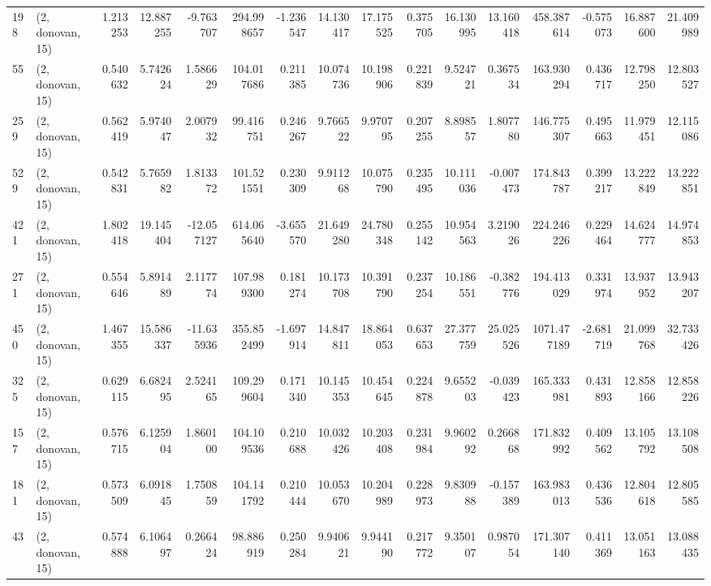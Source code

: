 \begin{tabular}{llrrrrrrrrrrrrrr}
198 &  (2, donovan, 15) &   1.213253 &  12.887255 &  -9.763707 &   294.998657 &  -1.236547 &  14.130417 &  17.175525 &  0.375705 &  16.130995 &  13.160418 &    458.387614 &  -0.575073 &   16.887600 &   21.409989 \\
55  &  (2, donovan, 15) &   0.540632 &   5.742624 &   1.586629 &   104.017686 &   0.211385 &  10.074736 &  10.198906 &  0.221839 &   9.524721 &   0.367534 &    163.930294 &   0.436717 &   12.798250 &   12.803527 \\
259 &  (2, donovan, 15) &   0.562419 &   5.974047 &   2.007932 &    99.416751 &   0.246267 &   9.766522 &   9.970795 &  0.207255 &   8.898557 &   1.807780 &    146.775307 &   0.495663 &   11.979451 &   12.115086 \\
529 &  (2, donovan, 15) &   0.542831 &   5.765982 &   1.813372 &   101.521551 &   0.230309 &   9.911268 &  10.075790 &  0.235495 &  10.111036 &  -0.007473 &    174.843787 &   0.399217 &   13.222849 &   13.222851 \\
421 &  (2, donovan, 15) &   1.802418 &  19.145404 & -12.057127 &   614.065640 &  -3.655570 &  21.649280 &  24.780348 &  0.255142 &  10.954563 &   3.219026 &    224.246226 &   0.229464 &   14.624777 &   14.974853 \\
271 &  (2, donovan, 15) &   0.554646 &   5.891489 &   2.117774 &   107.989300 &   0.181274 &  10.173708 &  10.391790 &  0.237254 &  10.186551 &  -0.382776 &    194.413029 &   0.331974 &   13.937952 &   13.943207 \\
450 &  (2, donovan, 15) &   1.467355 &  15.586337 & -11.635936 &   355.852499 &  -1.697914 &  14.847811 &  18.864053 &  0.637653 &  27.377759 &  25.025526 &   1071.477189 &  -2.681719 &   21.099768 &   32.733426 \\
325 &  (2, donovan, 15) &   0.629115 &   6.682495 &   2.524165 &   109.299604 &   0.171340 &  10.145353 &  10.454645 &  0.224878 &   9.655203 &  -0.039423 &    165.333981 &   0.431893 &   12.858166 &   12.858226 \\
157 &  (2, donovan, 15) &   0.576715 &   6.125904 &   1.860100 &   104.109536 &   0.210688 &  10.032426 &  10.203408 &  0.231984 &   9.960292 &   0.266868 &    171.832992 &   0.409562 &   13.105792 &   13.108508 \\
181 &  (2, donovan, 15) &   0.573509 &   6.091845 &   1.750859 &   104.141792 &   0.210444 &  10.053670 &  10.204989 &  0.228973 &   9.830988 &  -0.157389 &    163.983013 &   0.436536 &   12.804618 &   12.805585 \\
43  &  (2, donovan, 15) &   0.574888 &   6.106497 &   0.266424 &    98.886919 &   0.250284 &   9.940621 &   9.944190 &  0.217772 &   9.350107 &   0.987054 &    171.307140 &   0.411369 &   13.051163 &   13.088435 \\

\end{tabular}
